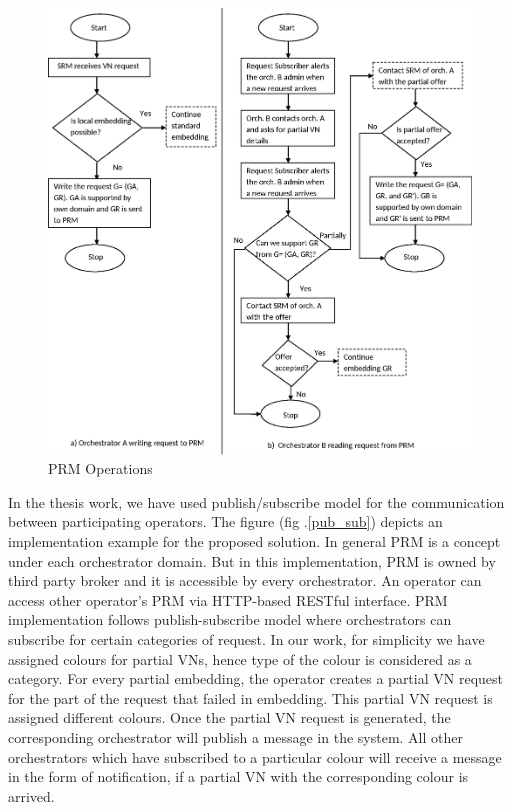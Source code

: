 \documentclass[article,dr=phil,type=msc ,colorback,accentcolor=tud4b]{tudthesis}
\begin{document}
\begin{figure}[h]
	\includegraphics[width=\linewidth]{flowchart}
	\caption{PRM Operations}
	\label{fl}
\end{figure}

In the thesis work, we have used publish/subscribe model for the communication between participating operators. The figure (fig .\ref{pub_sub}) depicts an implementation example for the proposed solution. In general PRM is a concept under each orchestrator domain. But in this implementation, PRM is owned by third party broker and it is accessible by every orchestrator. An operator can access other operator's PRM via HTTP-based RESTful interface. PRM implementation follows publish-subscribe model where orchestrators can subscribe for certain categories of request. In our work, for simplicity we have assigned colours for partial VNs, hence type of the colour is considered as a category. For every partial embedding, the operator creates a partial VN request for the part of the request that failed in embedding. This partial VN request is assigned different colours. Once the partial VN request is generated, the corresponding orchestrator will publish a message in the system. All other orchestrators which have subscribed to a particular colour will receive a message in the form of notification, if a partial VN with the corresponding colour is arrived.
\end{document}
